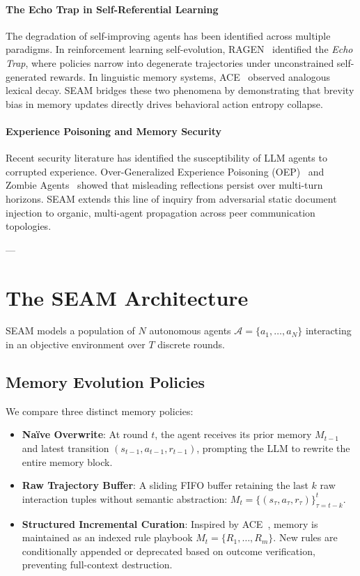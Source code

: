 \documentclass[11pt,a4paper]{article}
\begin{document}
\paragraph{The Echo Trap in Self-Referential Learning}
The degradation of self-improving agents has been identified across multiple paradigms. In reinforcement learning self-evolution, RAGEN~\cite{wang2025ragen} identified the \emph{Echo Trap}, where policies narrow into degenerate trajectories under unconstrained self-generated rewards. In linguistic memory systems, ACE~\cite{zhang2026ace} observed analogous lexical decay. SEAM bridges these two phenomena by demonstrating that brevity bias in memory updates directly drives behavioral action entropy collapse.

\paragraph{Experience Poisoning and Memory Security}
Recent security literature has identified the susceptibility of LLM agents to corrupted experience. Over-Generalized Experience Poisoning (OEP)~\cite{oep2026} and Zombie Agents~\cite{zombie2026} showed that misleading reflections persist over multi-turn horizons. SEAM extends this line of inquiry from adversarial static document injection to organic, multi-agent propagation across peer communication topologies.

---

\section{The SEAM Architecture}
\label{sec:architecture}

SEAM models a population of $N$ autonomous agents $\mathcal{A} = \{a_1, \dots, a_N\}$ interacting in an objective environment over $T$ discrete rounds.

\subsection{Memory Evolution Policies}
We compare three distinct memory policies:
\begin{itemize}
    \item \textbf{Naïve Overwrite}: At round $t$, the agent receives its prior memory $M_{t-1}$ and latest transition $(s_{t-1}, a_{t-1}, r_{t-1})$, prompting the LLM to rewrite the entire memory block.
    \item \textbf{Raw Trajectory Buffer}: A sliding FIFO buffer retaining the last $k$ raw interaction tuples without semantic abstraction: $M_t = \{(s_\tau, a_\tau, r_\tau)\}_{\tau=t-k}^t$.
    \item \textbf{Structured Incremental Curation}: Inspired by ACE~\cite{zhang2026ace}, memory is maintained as an indexed rule playbook $M_t = \{R_1, \dots, R_m\}$. New rules are conditionally appended or deprecated based on outcome verification, preventing full-context destruction.
\end{itemize}
\end{document}
